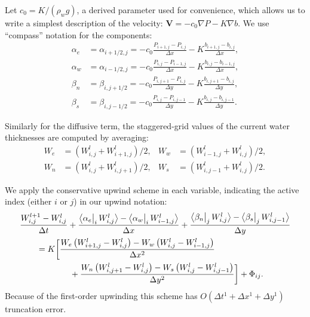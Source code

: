 \documentclass[12pt,final]{amsart}%
\newcommand\bV{\mathbf{V}}
\newcommand{\grad}{\nabla}
\newcommand{\Wlij}{W^l_{i,j}}
\newcommand{\upp}[3]{\big<#1\big|_{#3}\,#2\big>}
\begin{document}
Let $c_0=K/(\rho_w g)$, a derived parameter used for convenience, which allows us to write a simplest description of the velocity:  $\bV = - c_0 \grad P - K \grad b$.  We use ``compass'' notation for the components:
\begin{align*}
\alpha_e &= \alpha_{i+1/2,j} = - c_0 \frac{P_{i+1,j}-P_{i,j}}{\Delta x} - K \frac{b_{i+1,j}-b_{i,j}}{\Delta x}, \\
\alpha_w &= \alpha_{i-1/2,j} = - c_0 \frac{P_{i,j}-P_{i-1,j}}{\Delta x} - K \frac{b_{i,j}-b_{i-1,j}}{\Delta x}, \\
\beta_n  &= \beta_{i,j+1/2} = - c_0 \frac{P_{i,j+1}-P_{i,j}}{\Delta y} - K \frac{b_{i,j+1}-b_{i,j}}{\Delta y}, \\
\beta_s  &= \beta_{i,j-1/2} = - c_0 \frac{P_{i,j}-P_{i,j-1}}{\Delta y} - K \frac{b_{i,j}-b_{i,j-1}}{\Delta y}.
\end{align*}

Similarly for the diffusive term, the staggered-grid values of the current water thicknesses are computed by averaging:
\begin{align*}
W_e &= (W_{i,j}^l + W_{i+1,j}^l)/2, & W_w &= (W_{i-1,j}^l + W_{i,j}^l)/2, \\
W_n &= (W_{i,j}^l + W_{i,j+1}^l)/2, & W_s &= (W_{i,j-1}^l + W_{i,j}^l)/2.
\end{align*}

We apply the conservative upwind scheme in each variable, indicating the active index (either $i$ or $j$) in our upwind notation:
\begin{align}
 &\frac{W_{i,j}^{l+1} - \Wlij}{\Delta t} + \frac{\upp{\alpha_e}{\Wlij}{i} - \upp{\alpha_w}{W_{i-1,j}^l}{i}}{\Delta x} + \frac{\upp{\beta_n}{\Wlij}{j} - \upp{\beta_s}{W_{i,j-1}^l}{j}}{\Delta y}  \label{eq:Wfd} \\
      &\qquad = K \bigg[\frac{W_e \left(W_{i+1,j}^l - \Wlij\right) - W_w \left(\Wlij - W_{i-1,j}^l\right)}{\Delta x^2}  \notag \\
      &\qquad\qquad\qquad + \frac{W_n \left(W_{i,j+1}^l - \Wlij\right) - W_s \left(\Wlij - W_{i,j-1}^l\right)}{\Delta y^2}\bigg] + \Phi_{ij}. \notag
\end{align}
Because of the first-order upwinding this scheme has $O(\Delta t^1 + \Delta x^1 + \Delta y^1)$ truncation error.
\end{document}
